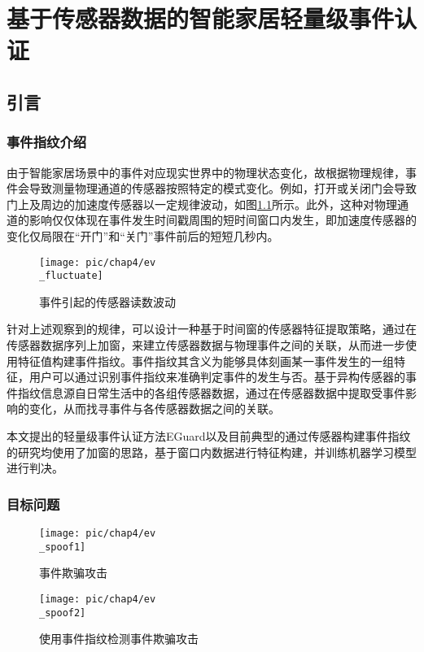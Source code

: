 \chapter{基于传感器数据的智能家居轻量级事件认证}

\section{引言}

\subsection{事件指纹介绍}
\label{fingerprint_description}

由于智能家居场景中的事件对应现实世界中的物理状态变化，故根据物理规律，事件会导致测量物理通道的传感器按照特定的模式变化。例如，打开或关闭门会导致门上及周边的加速度传感器以一定规律波动，如图\ref{fig:ev_fluctuate}所示。此外，这种对物理通道的影响仅仅体现在事件发生时间戳周围的短时间窗口内发生，即加速度传感器的变化仅局限在“开门”和“关门”事件前后的短短几秒内。

\begin{figure}[!h]
	\centering
	\texttt{[image: pic/chap4/ev\\\_fluctuate]}
	\caption{事件引起的传感器读数波动}
	\label{fig:ev_fluctuate}
\end{figure}

针对上述观察到的规律，可以设计一种基于时间窗的传感器特征提取策略，通过在传感器数据序列上加窗，来建立传感器数据与物理事件之间的关联，从而进一步使用特征值构建事件指纹。事件指纹其含义为能够具体刻画某一事件发生的一组特征，用户可以通过识别事件指纹来准确判定事件的发生与否。基于异构传感器的事件指纹信息源自日常生活中的各组传感器数据，通过在传感器数据中提取受事件影响的变化，从而找寻事件与各传感器数据之间的关联。

本文提出的轻量级事件认证方法EGuard以及目前典型的通过传感器构建事件指纹的研究均使用了加窗的思路，基于窗口内数据进行特征构建，并训练机器学习模型进行判决。

\subsection{目标问题}

\begin{figure}[!h]
	\centering
	\texttt{[image: pic/chap4/ev\\\_spoof1]}
	\caption{事件欺骗攻击}
	\label{fig:ev_spoof1}
\end{figure}

\begin{figure}[!h]
	\centering
	\texttt{[image: pic/chap4/ev\\\_spoof2]}
	\caption{使用事件指纹检测事件欺骗攻击}
	\label{fig:ev_spoof2}
\end{figure}

